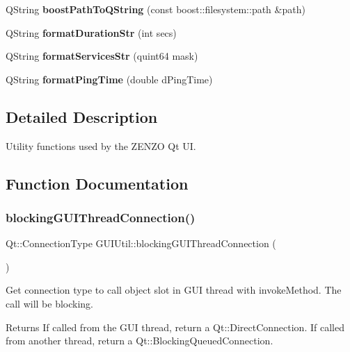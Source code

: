 \begin{DoxyCompactItemize}
Q\+String {\bfseries boost\+Path\+To\+Q\+String} (const boost\+::filesystem\+::path \&path)
\item 
\mbox{\label{namespace_g_u_i_util_aaf51686c47c77ad81c51d115d150e867}} 
Q\+String {\bfseries format\+Duration\+Str} (int secs)
\item 
\mbox{\label{namespace_g_u_i_util_ac0c0a23fbbfefc827220eebcacc3ee63}} 
Q\+String {\bfseries format\+Services\+Str} (quint64 mask)
\item 
\mbox{\label{namespace_g_u_i_util_a432bcee36e242a968c9149fadfba44fa}} 
Q\+String {\bfseries format\+Ping\+Time} (double d\+Ping\+Time)
\end{DoxyCompactItemize}


\subsection{Detailed Description}
Utility functions used by the Z\+E\+N\+ZO Qt UI. 

\subsection{Function Documentation}
\mbox{\label{namespace_g_u_i_util_a2046fc343a70996c23cae6fe7f8d94f2}} 
\subsubsection{\texorpdfstring{blockingGUIThreadConnection()}{blockingGUIThreadConnection()}}
{\footnotesize\ttfamily Qt\+::\+Connection\+Type G\+U\+I\+Util\+::blocking\+G\+U\+I\+Thread\+Connection (\begin{DoxyParamCaption}{ }\end{DoxyParamCaption})}

Get connection type to call object slot in G\+UI thread with invoke\+Method. The call will be blocking.

\begin{DoxyReturn}{Returns}
If called from the G\+UI thread, return a Qt\+::\+Direct\+Connection. If called from another thread, return a Qt\+::\+Blocking\+Queued\+Connection. 
\end{DoxyReturn}
\mbox{\label{namespace_g_u_i_util_aad7852433ad4953a9bcae9a6e735b2d4}} 
